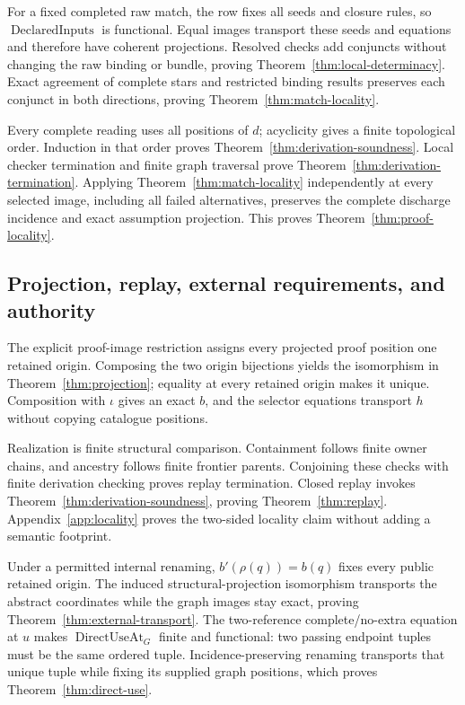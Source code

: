 \documentclass[11pt,twoside]{article}
\begin{document}
For a fixed completed raw match, the row fixes all seeds and closure rules, so
\(\operatorname{DeclaredInputs}\) is functional.  Equal images transport these
seeds and equations and therefore have coherent projections.  Resolved checks add
conjuncts without changing the raw binding or bundle, proving
Theorem~\ref{thm:local-determinacy}.  Exact agreement of complete stars and
restricted binding results preserves each conjunct in both directions, proving
Theorem~\ref{thm:match-locality}.

Every complete reading uses all positions of \(d\); acyclicity gives a finite
topological order.  Induction in that order proves
Theorem~\ref{thm:derivation-soundness}.  Local checker termination and finite graph
traversal prove Theorem~\ref{thm:derivation-termination}.  Applying
Theorem~\ref{thm:match-locality} independently at every selected image, including
all failed alternatives, preserves the complete discharge incidence and exact
assumption projection.  This proves Theorem~\ref{thm:proof-locality}.

\subsection{Projection, replay, external requirements, and authority}

The explicit proof-image restriction assigns every projected proof position one
retained origin.  Composing the two origin bijections yields the isomorphism in
Theorem~\ref{thm:projection}; equality at every retained origin makes it unique.
Composition with \(\iota\) gives an exact \(b\), and the selector equations
transport \(h\) without copying catalogue positions.

Realization is finite structural comparison.  Containment follows finite owner
chains, and ancestry follows finite frontier parents.  Conjoining these checks
with finite derivation checking proves replay termination.  Closed replay invokes
Theorem~\ref{thm:derivation-soundness}, proving
Theorem~\ref{thm:replay}.  Appendix~\ref{app:locality} proves the two-sided locality
claim without adding a semantic footprint.

Under a permitted internal renaming, \(b'(\rho(q))=b(q)\) fixes every public
retained origin.  The induced structural-projection isomorphism transports the
abstract coordinates while the graph images stay exact, proving
Theorem~\ref{thm:external-transport}.  The two-reference complete/no-extra
equation at \(u\) makes \(\operatorname{DirectUseAt}_G\) finite and functional:
two passing endpoint tuples must be the same ordered tuple.  Incidence-preserving
renaming transports that unique tuple while fixing its supplied graph positions,
which proves Theorem~\ref{thm:direct-use}.
\end{document}
